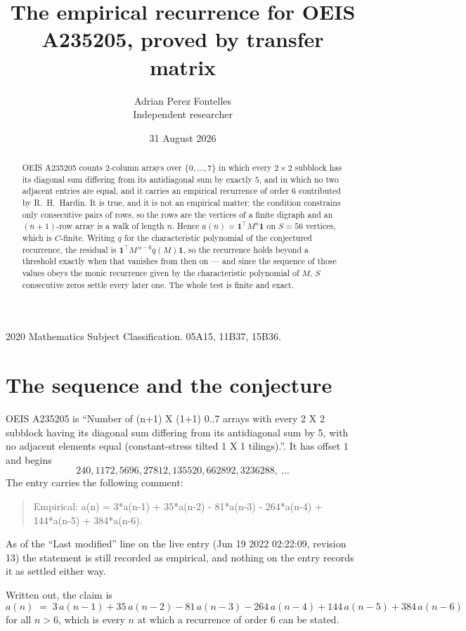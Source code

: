 \documentclass[11pt,a4paper]{article}
\title{The empirical recurrence for OEIS A235205, proved by transfer matrix}
\author{Adrian Perez Fontelles\\ \small Independent researcher}
\date{31 August 2026}
\theoremstyle{plain}
\theoremstyle{definition}
\begin{document}
\maketitle

\begin{abstract}
OEIS A235205 counts $2$-column arrays over $\{0,\dots,7\}$ in which every
$2\times2$ subblock has its diagonal sum differing from its antidiagonal sum by
exactly $5$, and in which no two adjacent entries are equal, and it
carries an empirical recurrence of order $6$ contributed by R.~H.~Hardin. It is true,
and it is not an empirical matter: the condition constrains only consecutive pairs of rows,
so the rows are the vertices of a finite digraph and an $(n+1)$-row array is a walk of
length $n$. Hence $a(n)=\mathbf{1}^{\!\top}M^{n}\mathbf{1}$ on $S=56$ vertices, which
is $C$-finite. Writing $q$ for the characteristic polynomial of the conjectured recurrence,
the residual is $\mathbf{1}^{\!\top}M^{\,n-6}q(M)\mathbf{1}$, so the recurrence
holds beyond a threshold exactly when that vanishes from then on --- and since the sequence
of those values obeys the monic recurrence given by the characteristic polynomial of $M$,
$S$ consecutive zeros settle every later one. The whole test is finite and exact.
\end{abstract}

\noindent\small 2020 Mathematics Subject Classification. 05A15, 11B37, 15B36.\normalsize

\section{The sequence and the conjecture}

OEIS A235205 is ``Number of (n+1) X (1+1) 0..7 arrays with every 2 X 2 subblock having its diagonal sum differing from its antidiagonal sum by 5, with no adjacent elements equal (constant-stress tilted 1 X 1 tilings).''. It has offset
$1$ and begins
\[
240, 1172, 5696, 27812, 135520, 662892, 3236288,\ \dots
\]
The entry carries the following comment:
\begin{quote}\small
Empirical: a(n) = 3*a(n-1) + 35*a(n-2) - 81*a(n-3) - 264*a(n-4) + 144*a(n-5) + 384*a(n-6).
\end{quote}
As of the ``Last modified'' line on the live entry (Jun 19 2022 02:22:09, revision 13) the statement is
still recorded as empirical, and nothing on the entry records it as settled either way.

Written out, the claim is
\begin{equation}\label{eq:conj}
a(n)\;=\;3\,a(n-1) + 35\,a(n-2) - 81\,a(n-3) - 264\,a(n-4) + 144\,a(n-5) + 384\,a(n-6)
\end{equation}
for all $n>6$, which is every $n$ at which a recurrence of order $6$ can be
stated.
\end{document}
